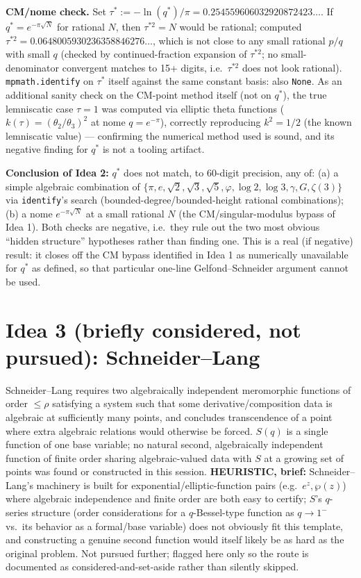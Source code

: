 \documentclass[11pt]{article}
\begin{document}
\textbf{CM/nome check.} Set $\tau^\ast := -\ln(q^\ast)/\pi = 0.254559606032920872423\ldots$. If
$q^\ast=e^{-\pi\sqrt N}$ for rational $N$, then $\tau^{\ast2}=N$ would be rational; computed
$\tau^{\ast2}=0.0648005930236358846276\ldots$, which is not close to any small rational
$p/q$ with small $q$ (checked by continued-fraction expansion of $\tau^{\ast2}$; no small-denominator
convergent matches to 15+ digits, i.e.\ $\tau^{\ast2}$ does not look rational). \texttt{mpmath.identify}
on $\tau^\ast$ itself against the same constant basis: also \texttt{None}. As an additional sanity
check on the CM-point method itself (not on $q^\ast$), the true lemniscatic case $\tau=1$ was
computed via elliptic theta functions ($k(\tau)=(\theta_2/\theta_3)^2$ at nome $q=e^{-\pi}$),
correctly reproducing $k^2=1/2$ (the known lemniscatic value) --- confirming the numerical method
used is sound, and its negative finding for $q^\ast$ is not a tooling artifact.

\textbf{Conclusion of Idea 2:} $q^\ast$ does not match, to 60-digit precision, any of: (a) a
simple algebraic combination of $\{\pi,e,\sqrt2,\sqrt3,\sqrt5,\varphi,\log2,\log3,\gamma,G,\zeta(3)\}$
via \texttt{identify}'s search (bounded-degree/bounded-height rational combinations); (b) a nome
$e^{-\pi\sqrt N}$ at a small rational $N$ (the CM/singular-modulus bypass of Idea 1). Both checks
are negative, i.e.\ they rule out the two most obvious ``hidden structure'' hypotheses rather than
finding one. This is a real (if negative) result: it closes off the CM bypass identified in Idea
1 as numerically unavailable for $q^\ast$ as defined, so that particular one-line
Gelfond--Schneider argument cannot be used.

\section{Idea 3 (briefly considered, not pursued): Schneider--Lang}

Schneider--Lang requires two algebraically independent meromorphic functions of order $\le\rho$
satisfying a system such that some derivative/composition data is algebraic at sufficiently many
points, and concludes transcendence of a point where extra algebraic relations would otherwise
be forced. $S(q)$ is a single function of one base variable; no natural second, algebraically
independent function of finite order sharing algebraic-valued data with $S$ at a growing set of
points was found or constructed in this session. \textbf{HEURISTIC, brief:} Schneider--Lang's
machinery is built for exponential/elliptic-function pairs (e.g.\ $e^z,\wp(z)$) where algebraic
independence and finite order are both easy to certify; $S$'s $q$-series structure (order
considerations for a $q$-Bessel-type function as $q\to1^-$ vs.\ its behavior as a formal/base
variable) does not obviously fit this template, and constructing a genuine second function would
itself likely be as hard as the original problem. Not pursued further; flagged here only so the
route is documented as considered-and-set-aside rather than silently skipped.
\end{document}
